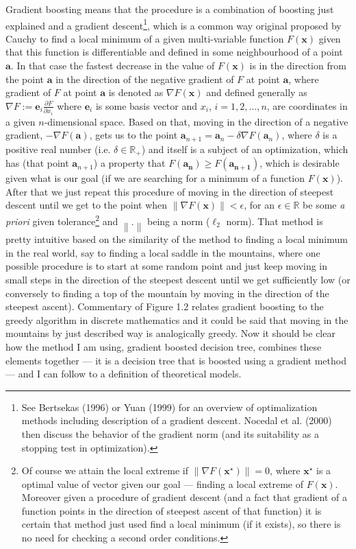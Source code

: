 \documentclass[12pt, twoside]{book} %
\newcommand{\norm}[1]{\left\lVert#1\right\rVert}
\begin{document}
Gradient boosting means that the procedure is a combination of boosting just explained and a gradient descent\footnote{See Bertsekas (1996) or Yuan (1999) for an overview of optimalization methods including description of a gradient descent. Nocedal et al. (2000) then discuss the behavior of the gradient norm (and its suitability as a stopping test in optimization).}, which is a common way original proposed by Cauchy to find a local minimum of a given multi-variable function $F(\mathbf{x})$ given that this function is differentiable and defined in some neighbourhood of a point $\mathbf{a}$. In that case the fastest decrease in the value of $F(\mathbf{x})$ is in the direction from the point $\mathbf{a}$ in the direction of the negative gradient of $F$ at point $\mathbf{a}$, where gradient of $F$ at point $\mathbf{a}$ is denoted as $\nabla F(\mathbf{x})$ and defined generally as $\nabla F:= \mathbf{e}_i \frac{\partial F}{\partial x_i}$ where $\mathbf{e}_i$ is some basis vector and  $x_i$, $i=1, 2,\ldots, n$, are coordinates in a given $n$-dimensional space. Based on that, moving in the direction of a negative gradient, $- \nabla F(\mathbf{a})$, gets us to the point $\mathbf{a}_{n+1} = \mathbf{a}_n-\delta\nabla F(\mathbf{a}_n)$, where $\delta$ is a positive real number (i.e. $\delta \in \mathbb{R}_{+}$) and itself is a subject of an optimization, which has (that point $\mathbf{a}_{n+1}$) a property that $F(\mathbf{a_n})\geq F(\mathbf{a_{n+1}})$, which is desirable given what is our goal (if we are searching for a minimum of a function $F(\mathbf{x})$). After that we just repeat this procedure of moving in the direction of steepest descent until we get to the point when $\norm{\nabla F (\mathbf{x}) } < \epsilon$, for an $\epsilon \in \mathbb{R}$ be some \textit{a priori} given tolerance\footnote{Of course we attain the local extreme if  $\norm{\nabla F (\mathbf{x^\star}) }= 0$, where $\mathbf{x^\star}$ is a optimal value of vector given our goal — finding a local extreme of $F(\mathbf{x})$. Moreover given a procedure of gradient descent (and a fact that gradient of a function points in the direction of steepest ascent of that function) it is certain that method just used find a local minimum (if it exists), so there is no need for checking a second order conditions.} and $\norm{\mathbf{.}}$ being a norm ($\ell_2$ norm). That method is pretty intuitive based on the similarity of the method to finding a local minimum in the real world, say to finding a local saddle in the mountains, where one possible procedure is to start at some random point and just keep moving in small steps in the direction of the steepest descent until we get sufficiently low (or conversely to finding a top of the mountain by moving in the direction of the steepest ascent). Commentary of Figure 1.2 relates gradient boosting to the greedy algorithm in discrete mathematics and it could be said that moving in the mountains by just described way is analogically greedy. \newline
Now it should be clear how the method I am using, gradient boosted decision tree, combines these elements together — it is a decision tree that is boosted using a gradient method — and I can follow to a definition of theoretical models.\newline
\end{document}
